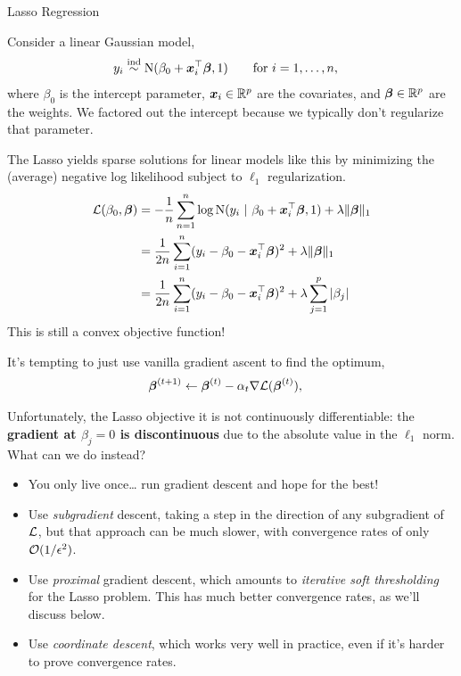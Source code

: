 \documentclass[aspectratio=169]{beamer}
\begin{document}
\begin{frame}[t,allowframebreaks]{Lasso Regression}\label{lasso-regression}

Consider a linear Gaussian model, 
\begin{align*}
y_i & \stackrel{\text{ind}}{\sim} \mathrm{N}(\beta_0 + \boldsymbol{x}_i^\top \boldsymbol{\beta}, 1) \qquad \text{for } i = 1, \ldots,n,
\end{align*} where \(\beta_0\) is the intercept
parameter, \(\boldsymbol{x}_i \in \mathbb{R}^p\) are the covariates, and
\(\boldsymbol{\beta} \in \mathbb{R}^p\) are the weights. We factored out the intercept
because we typically don't regularize that parameter.

The Lasso yields sparse solutions for linear models like this by
minimizing the (average) negative log likelihood subject to \(\ell_1\)
regularization. \begin{align*}
\mathcal{L}(\beta_0, \boldsymbol{\beta}) 
&= -\frac{1}{n} \sum_{n=1}^n \log \mathrm{N}(y_i ~\vert~ \beta_0 + \boldsymbol{x}_i^\top \boldsymbol{\beta}, 1) + \lambda \|\boldsymbol{\beta}\|_1 \\
&= \frac{1}{2n} \sum_{i=1}^n (y_i - \beta_0 - \boldsymbol{x}_i^\top \boldsymbol{\beta})^2 + \lambda \|\boldsymbol{\beta}\|_1 \\
&= \frac{1}{2n} \sum_{i=1}^n (y_i - \beta_0 - \boldsymbol{x}_i^\top \boldsymbol{\beta})^2 + \lambda \sum_{j=1}^p |\beta_j|
\end{align*} 
This is still a convex objective function!

It's tempting to just use vanilla gradient ascent to find the optimum,
\begin{align*}
\boldsymbol{\beta}^{(t+1)} &\leftarrow \boldsymbol{\beta}^{(t)} - \alpha_t \nabla \mathcal{L}(\boldsymbol{\beta}^{(t)}),
\end{align*} 

Unfortunately, the Lasso objective it is not continuously
differentiable: the \textbf{gradient at \(\beta_j=0\) is discontinuous}
due to the absolute value in the \(\ell_1\) norm. What can we do
instead? 
\begin{itemize}
    \item You only live once\ldots{} run gradient descent and hope for
the best! 
    \item Use \emph{subgradient} descent, taking a step in the
direction of any subgradient of \(\mathcal{L}\), but that approach can be much
slower, with convergence rates of only \(\mathcal{O}(1/\epsilon^2)\). 
    \item Use
\emph{proximal} gradient descent, which amounts to \emph{iterative soft
thresholding} for the Lasso problem. This has much better convergence
rates, as we'll discuss below. 
    \item Use \emph{coordinate descent}, which
works very well in practice, even if it's harder to prove convergence
rates.
\end{itemize}
\end{frame}
\end{document}
